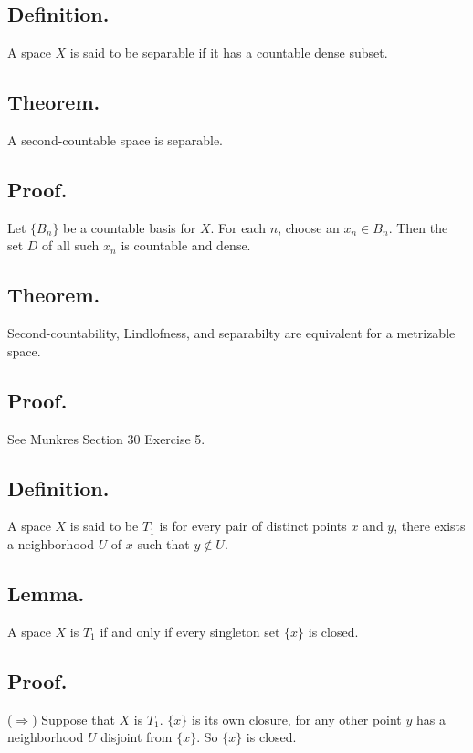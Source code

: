 \documentclass[titlepage]{article}
\begin{document}
\subsection{Definition.} A space $X$ is said to be separable if it has a countable dense subset.

\subsection{Theorem.} A second-countable space is separable.

\subsection{Proof.}

Let $\{B_{n}\}$ be a countable basis for $X$. For each $n$, choose an $x_{n} \in B_{n}$. Then the set $D$ of all such $x_{n}$ is countable and dense.

\subsection{Theorem.} Second-countability, Lindlofness, and separabilty are equivalent for a metrizable space.

\subsection{Proof.} See Munkres Section 30 Exercise 5.

\subsection{Definition.} A space $X$ is said to be $T_{1}$ is for every pair of distinct points $x$ and $y$, there exists a neighborhood $U$ of $x$ such that $y \notin U$.

\subsection{Lemma.} A space $X$ is $T_{1}$ if and only if every singleton set $\{x\}$ is closed.

\subsection{Proof.}

($\Rightarrow$) Suppose that $X$ is $T_{1}$. $\{x\}$ is its own closure, for any other point $y$ has a neighborhood $U$ disjoint from $\{x\}$. So $\{x\}$ is closed.
\end{document}
